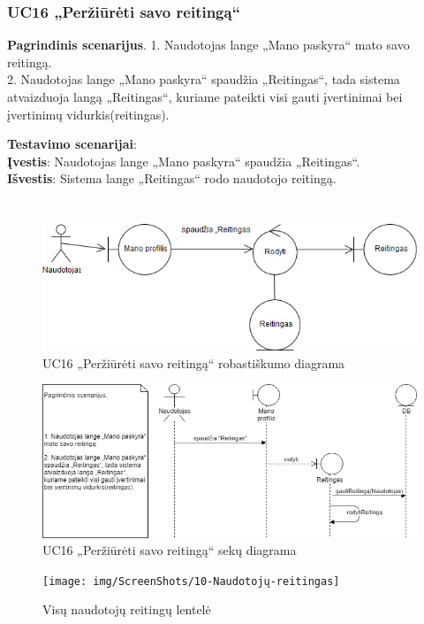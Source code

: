 \documentclass{VUMIFPSbakalaurinis}
\begin{document}
\subsubsection{UC16 „Peržiūrėti savo reitingą“}
\textbf{Pagrindinis scenarijus}. 1. Naudotojas lange „Mano paskyra“ mato savo reitingą. \\
2. Naudotojas lange „Mano paskyra“ spaudžia „Reitingas“, tada sistema atvaizduoja langą „Reitingas“, kuriame pateikti visi gauti įvertinimai bei įvertinimų vidurkis(reitingas).
\par \textbf{Testavimo scenarijai}:\\
\textbf{Įvestis}: Naudotojas lange „Mano paskyra“ spaudžia  „Reitingas“. \\
\textbf{Išvestis}: Sistema lange  „Reitingas“ rodo naudotojo reitingą.\\ \\

\begin{figure}[H]
	\centering
	\includegraphics[scale=0.6]{img/Robustness/UC16}
	\caption{UC16 „Peržiūrėti savo reitingą“ robastiškumo diagrama}
	\label{img:uc16rob}
\end{figure}

\begin{figure}[H]
	\centering
	\includegraphics[scale=0.6]{img/Sequence/SD16}
	\caption{UC16 „Peržiūrėti savo reitingą“ sekų diagrama}
	\label{img:uc16seq}
\end{figure}

\begin{figure}[H]
	\centering
	\texttt{[image: img/ScreenShots/10-Naudotojų-reitingas]}
	\caption{Visų naudotojų reitingų lentelė}
	\label{img:rating table}
\end{figure}
\end{document}
